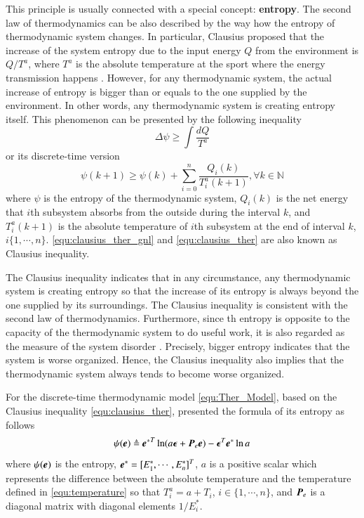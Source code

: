 \documentclass[preprint,authoryear,12pt]{elsarticle}
\renewcommand{\vec}[1]{\mbox{\boldmath$#1$}}
\newcommand{\mat}[1]{\mbox{\boldmath$#1$}}
\begin{document}
This principle is usually connected with a special concept: \textbf{entropy}. The second law of thermodynamics can be also described by the way how the entropy of thermodynamic system changes.
In particular, Clausius proposed that the increase of the system entropy due to the input energy $Q$ from the environment is $Q/T^a$, where $T^a$ is the absolute temperature at the sport where the energy transmission happens \citep{clausius_mechanical_1867}. However, for any thermodynamic system, the actual increase of entropy is bigger than or equals to the one supplied by the environment. In other words, any thermodynamic system is creating entropy itself. This phenomenon can be presented by the following inequality
\begin{equation}\label{equ:clausius_ther_gnl}
\Delta \psi \ge \int\frac{dQ}{T^a}
\end{equation}
or its discrete-time version \citep{haddad_thermodynamic_2005}
\begin{equation}\label{equ:clausius_ther}
\psi(k+1) \ge \psi(k)+\sum_{i=0}^{n}\frac{Q_i(k)}{T^a_i(k+1)},
\forall k\in\mathbb{N}
\end{equation}
where $\psi$ is the entropy of the thermodynamic system, $Q_i(k)$ is the net energy that $i$th subsystem absorbs from the outside during the interval $k$, and $T^a_i(k+1)$ is the absolute temperature of $i$th subsystem at the end of interval $k$, $i\{1,\cdots,n\}$. \eqref{equ:clausius_ther_gnl} and \eqref{equ:clausius_ther} are also known as Clausius inequality.

The Clausius inequality indicates that in any circumstance, any thermodynamic system is creating entropy so that the increase of its entropy is always beyond the one supplied by its surroundings. The Clausius inequality is consistent  with the second law of thermodynamics. Furthermore, since th entropy is opposite to the capacity of the thermodynamic system to do useful work, it is also regarded as the measure of the system disorder \citep{balmakov_entropy_2001}. Precisely, bigger entropy indicates that the system is worse organized. Hence, the Clausius inequality also implies that the thermodynamic system always tends to become worse organized.

For the discrete-time thermodynamic model \eqref{equ:Ther_Model}, based on the Clausius inequality \eqref{equ:clausius_ther}, \citet{haddad_thermodynamic_2005} presented the formula of its entropy as follows
\begin{equation}
\psi(\vec{e}) \triangleq{\vec{e}^*}^T \ln
(a\vec{\epsilon}+\mat{P}_e\vec{e}) -\vec{\epsilon}^T\vec{e}^*\ln a
\label{equ:Ther_entropy}
\end{equation}
where $\psi(\vec{e})$ is the entropy, $\vec{e}^*=[E^*_1,\cdots,E^*_n]^T$, $a$ is a positive scalar which represents the difference between the absolute temperature and the temperature defined in \eqref{equ:temperature} so that $T^a_i=a+T_i$, $i\in\{1,\cdots,n\}$, and $\mat{P}_e$ is a diagonal matrix with diagonal elements $1/E^*_i$.
\end{document}
